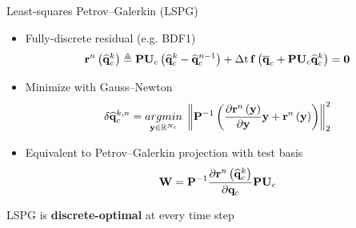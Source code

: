 \documentclass[]{beamer}
\begin{document}
\begin{frame}{Least-squares Petrov--Galerkin (LSPG)\footnotemark[1]}
    \begin{itemize}
		\item Fully-discrete residual (e.g. BDF1)
		\begin{equation*}
			\resFuncIter{\timeIdx}{\consVecCoef^{\newtonIdx}} \triangleq \consScale \consTrial \left( \consVecCoef^{\newtonIdx} - \consVecCoef^{\timeIdx-1} \right) + \dt \, \rhsFunc{\consVecCent + \consScale \consTrial \consVecCoef^{\newtonIdx}} = \zeroVec
		\end{equation*}
		\item Minimize with Gauss--Newton
		\begin{equation*}
			\delta \consVecCoef^{\newtonIdx, \timeIdx} = \argmin{\dummyVec \in \mathbb{R}^{\numConsvModes}} \norm{\consScaleInv \left(\pde{\resFuncIter{\timeIdx}{\dummyVec}}{\dummyVec} \dummyVec + \resFuncIter{\timeIdx}{\dummyVec}\right)}_2^2
		\end{equation*}
		\item Equivalent to Petrov--Galerkin projection with test basis
		\begin{equation*}
			\testBasis = \consScaleInv \pde{\resFuncIter{\timeIdx}{\consVecCoef^{\newtonIdx}}}{\consVec} \consScale \consTrial
		\end{equation*}
	\end{itemize}
	\vspace{-1em}
	\begin{tcolorbox}[colframe=blue!50!white,halign=center]
		LSPG is \textbf{discrete-optimal} at every time step
	\end{tcolorbox}
\end{frame}
\end{document}
